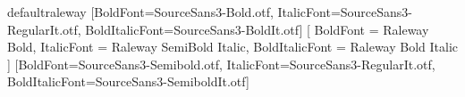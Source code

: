
\usepackage{fontspec}

\setmainfont{Latin Modern Roman}
\renewcommand{\familydefault}{\sfdefault}

\providecommand\FontVariant{default}
\def\FontVariantRaleway{raleway}
\ifx\FontVariant\FontVariantRaleway
  \setsansfont{SourceSans3-Regular.otf}[BoldFont=SourceSans3-Bold.otf,
    ItalicFont=SourceSans3-RegularIt.otf, BoldItalicFont=SourceSans3-BoldIt.otf]
  \newfontfamily{}
  \newfontfamily{}[
    BoldFont       = {Raleway Bold},
    ItalicFont     = {Raleway SemiBold Italic},
    BoldItalicFont = {Raleway Bold Italic}
  ]
\else
  \setsansfont{SourceSans3-Regular.otf}[BoldFont=SourceSans3-Semibold.otf,
    ItalicFont=SourceSans3-RegularIt.otf, BoldItalicFont=SourceSans3-SemiboldIt.otf]
  \newcommand{\titlefont}{\sffamily}
  \newcommand{\headingfont}{\sffamily}
\fi

\newfontfamily{}

\newfontfamily{}
\newfontfamily{}

\newfontfamily{}
